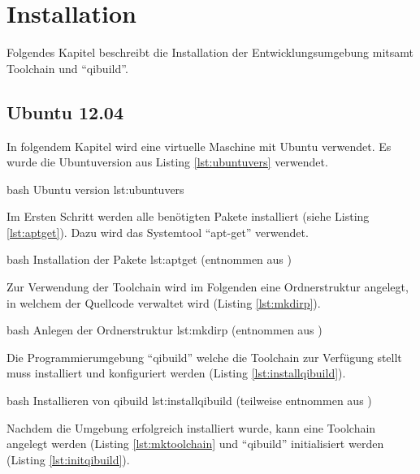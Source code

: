 \chapter{Installation}

    Folgendes Kapitel beschreibt die Installation der Entwicklungsumgebung mitsamt
    Toolchain und ``qibuild''.

    \section{Ubuntu 12.04}

        In folgendem Kapitel wird eine virtuelle Maschine mit Ubuntu
        verwendet.
        Es wurde die Ubuntuversion aus Listing \ref{lst:ubuntuvers} verwendet.

                    {bash}
                    {Ubuntu version}
                    {lst:ubuntuvers}

        Im Ersten Schritt werden alle benötigten Pakete installiert (siehe
        Listing \ref{lst:aptget}).
        Dazu wird das Systemtool ``apt-get'' verwendet.

                    {bash}
                    {Installation der Pakete}
                    {lst:aptget}
        (entnommen aus \cite[S. 5, f.]{projss15})

        Zur Verwendung der Toolchain wird im Folgenden eine Ordnerstruktur
        angelegt, in welchem der Quellcode verwaltet wird (Listing
        \ref{lst:mkdirp}).

                    {bash}
                    {Anlegen der Ordnerstruktur}
                    {lst:mkdirp}
        (entnommen aus \cite[S. 4]{projss15})

        Die Programmierumgebung ``qibuild'' welche die Toolchain zur Verfügung
        stellt muss installiert und konfiguriert werden (Listing
        \ref{lst:installqibuild}).

                    {bash}
                    {Installieren von qibuild}
                    {lst:installqibuild}
        (teilweise entnommen aus \cite[S. 5]{projss15})

        Nachdem die Umgebung erfolgreich installiert wurde, kann eine Toolchain
        angelegt werden (Listing \ref{lst:mktoolchain} und ``qibuild''
        initialisiert werden (Listing \ref{lst:initqibuild}).

